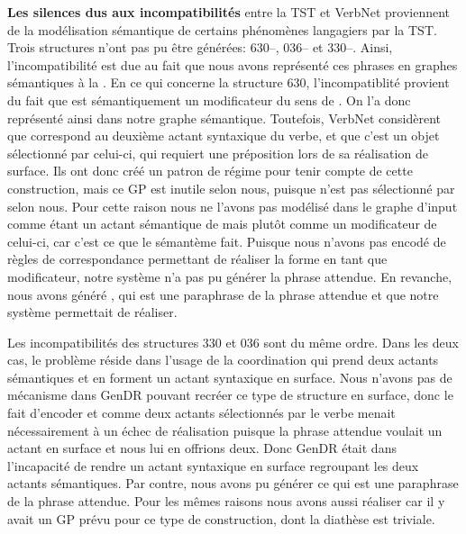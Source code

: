 \textbf{Les silences dus aux incompatibilités} entre la \ac{TST} et VerbNet proviennent de la modélisation sémantique de certains phénomènes langagiers par la \ac{TST}. Trois structures n'ont pas pu être générées: 630--, 036-- et 330--. Ainsi, l'incompatibilité est due au fait que nous avons représenté ces phrases en graphes sémantiques à la \cite{mel2012semantics}. 
En ce qui concerne la structure 630, l'incompatiblité provient du fait que  est sémantiquement un modificateur du sens de . On l'a donc représenté ainsi dans notre graphe sémantique. Toutefois, VerbNet considèrent que  correspond au deuxième actant syntaxique du verbe, et que c'est un objet sélectionné par celui-ci, qui requiert une préposition lors de sa réalisation de surface. Ils ont donc créé un patron de régime pour tenir compte de cette construction, mais ce \ac{GP} est inutile selon nous, puisque  n'est pas sélectionné par  selon nous. Pour cette raison nous ne l'avons pas modélisé dans le graphe d'input comme étant un actant sémantique de  mais plutôt comme un modificateur de celui-ci, car c'est ce que le sémantème  fait. Puisque nous n'avons pas encodé de règles de correspondance permettant de réaliser la forme  en tant que modificateur, notre système n'a pas pu générer la phrase attendue. En revanche, nous avons généré , qui est une paraphrase de la phrase attendue et que notre système permettait de réaliser. 

Les incompatibilités des structures 330 et 036 sont du même ordre. Dans les deux cas, le problème réside dans l'usage de la coordination  qui prend deux actants sémantiques et en forment un actant syntaxique en surface. Nous n'avons pas de mécanisme dans GenDR pouvant recréer ce type de structure en surface, donc le fait d'encoder  et  comme deux actants sélectionnés par le verbe menait nécessairement à un échec de réalisation puisque la phrase attendue voulait un actant en surface et nous lui en offrions deux. Donc GenDR était dans l'incapacité de rendre un actant syntaxique en surface regroupant les deux actants sémantiques. Par contre, nous avons pu générer  ce qui est une paraphrase de la phrase attendue. Pour les mêmes raisons nous avons aussi réaliser  car il y avait un \ac{GP} prévu pour ce type de construction, dont la diathèse est triviale.

